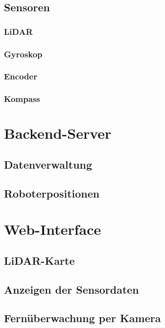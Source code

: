 \documentclass[12pt]{article}
\begin{document}
	\subsection{Sensoren}
	\subsubsection{LiDAR}
	\subsubsection{Gyroskop}
	\subsubsection{Encoder}
	\subsubsection{Kompass}
	\section{Backend-Server}
	\subsection{Datenverwaltung}
	\subsection{Roboterpositionen}
	\section{Web-Interface}
	\subsection{LiDAR-Karte}
	\subsection{Anzeigen der Sensordaten}
	\subsection{Fernüberwachung per Kamera}

	\newpage
	\begin{appendix}
		\listoffigures
		\listoftables
	\end{appendix}
	\vspace{1cm}
\end{document}

